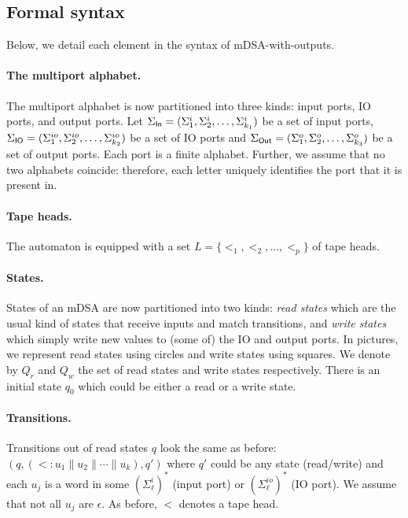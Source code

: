 \subsection{Formal syntax} 

Below, we detail each element in the syntax of mDSA-with-outputs.

\paragraph*{The multiport alphabet.} The multiport alphabet is now partitioned into three kinds: input ports, IO ports, and output ports. Let $\Sigma_{\mathsf{In}} = (\Sigma_1^{i}, \Sigma_2^{i}, \dots, \Sigma_{k_1}^{i})$ be a set of input ports, $\Sigma_{\mathsf{IO}} =(\Sigma_1^{io}, \Sigma_2^{io}, \dots, \Sigma_{k_2}^{io})$ be a set of IO ports and $\Sigma_{\mathsf{Out}} = (\Sigma_1^{o}, \Sigma_2^{o}, \dots, \Sigma_{k_3}^{o})$ be a set of output ports. Each port is a finite alphabet. Further, we assume that no two alphabets coincide: therefore, each letter uniquely identifies the port that it is present in. 

\paragraph*{Tape heads.} The automaton is equipped with a set $L = \{ \lt_1, \lt_2, \dots, \lt_p\}$ of tape heads. 

\paragraph*{States.} States of an mDSA are now partitioned into two kinds: \emph{read states} which are the usual kind of states that receive inputs and match transitions, and \emph{write states} which simply write new values to (some of) the IO and output ports. In pictures, we represent read states using circles and write states using squares. We denote by $Q_r$ and $Q_w$ the set of read states and write states respectively. There is an initial state $q_0$ which could be either a read or a write state. 

\paragraph*{Transitions.} Transitions out of read states $q$ look the same as before: $(q, (\lt: u_1 \parallel u_2 \parallel \cdots \parallel u_k), q')$ where $q'$ could be any state (read/write) and each $u_j$ is a word in some $(\Sigma^i_\ell)^*$ (input port) or $(\Sigma^{io}_\ell)^*$ (IO port).  We assume that not all $u_j$ are $\epsilon$. As before, $\lt$ denotes a tape head. 


